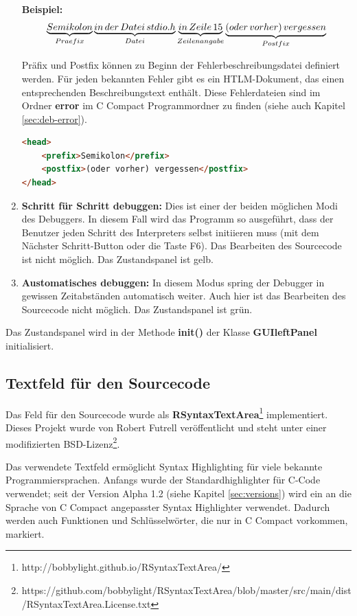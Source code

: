 \begin{enumerate}
\textbf{Beispiel:}
\[
\underbrace{Semikolon}_{Praefix} \underbrace{in\thinspace der\thinspace Datei\thinspace stdio.h}_{Datei} \underbrace{in\thinspace Zeile\thinspace 15}_{Zeilenangabe} \underbrace{(oder\thinspace vorher)\thinspace vergessen}_{Postfix}
\]

Präfix und Postfix können zu Beginn der Fehlerbeschreibungsdatei definiert werden. Für jeden bekannten Fehler gibt es ein HTLM-Dokument, das einen entsprechenden Beschreibungstext enthält. Diese Fehlerdateien sind im Ordner \textbf{error} im C Compact Programmordner zu finden (siehe auch Kapitel \ref{sec:deb-error}).

\begin{lstlisting}[language=HTML]
<head>
	<prefix>Semikolon</prefix>
	<postfix>(oder vorher) vergessen</postfix>
</head>
\end{lstlisting}

\item \textbf{Schritt für Schritt debuggen:} Dies ist einer der beiden möglichen Modi des Debuggers. In diesem Fall wird das Programm so ausgeführt, dass der Benutzer jeden Schritt des Interpreters selbst initiieren muss (mit dem \glqq{}Nächster Schritt\grqq{}-Button oder die Taste F6). Das Bearbeiten des Sourcecode ist nicht möglich. Das Zustandspanel ist gelb.

\item \textbf{Austomatisches debuggen:} In diesem Modus spring der Debugger  in gewissen Zeitabständen automatisch weiter. Auch hier ist das Bearbeiten des Sourcecode nicht möglich. Das Zustandspanel ist grün.
\end{enumerate}

Das Zustandspanel wird in der Methode \textbf{init()} der Klasse \textbf{GUIleftPanel} initialisiert.

\subsection{Textfeld für den Sourcecode}
\label{sec:gui-main-left-code}
Das Feld für den Sourcecode wurde als \textbf{RSyntaxTextArea}\footnote{http://bobbylight.github.io/RSyntaxTextArea/} implementiert. Dieses Projekt wurde von Robert Futrell veröffentlicht und steht unter einer modifizierten BSD-Lizenz\footnote{https://github.com/bobbylight/RSyntaxTextArea/blob/master/src/main/dist/RSyntaxTextArea.License.txt}.

Das verwendete Textfeld ermöglicht Syntax Highlighting für viele bekannte Programmiersprachen. Anfangs wurde der Standardhighlighter für C-Code verwendet; seit der Version Alpha 1.2 (siehe Kapitel \ref{sec:versions}) wird ein an die Sprache von C Compact angepasster Syntax Highlighter verwendet. Dadurch werden auch Funktionen und Schlüsselwörter, die nur in C Compact vorkommen, markiert.

